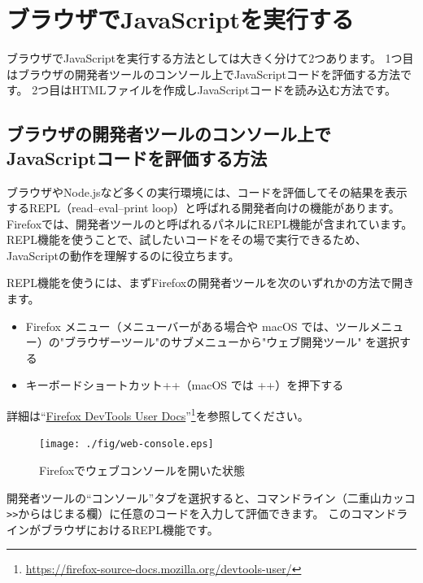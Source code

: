 \hypertarget{execute-js-on-browser}{%
\section{ブラウザでJavaScriptを実行する}\label{execute-js-on-browser}}

ブラウザでJavaScriptを実行する方法としては大きく分けて2つあります。
1つ目はブラウザの開発者ツールのコンソール上でJavaScriptコードを評価する方法です。
2つ目はHTMLファイルを作成しJavaScriptコードを読み込む方法です。

\hypertarget{repl-on-browser}{%
\subsection{ブラウザの開発者ツールのコンソール上でJavaScriptコードを評価する方法}\label{repl-on-browser}}

ブラウザやNode.jsなど多くの実行環境には、コードを評価してその結果を表示するREPL（read--eval--print
loop）と呼ばれる開発者向けの機能があります。
Firefoxでは、開発者ツールの\textbf{}と呼ばれるパネルにREPL機能が含まれています。
REPL機能を使うことで、試したいコードをその場で実行できるため、JavaScriptの動作を理解するのに役立ちます。

REPL機能を使うには、まずFirefoxの開発者ツールを次のいずれかの方法で開きます。

\begin{itemize}
\item
  Firefox メニュー（メニューバーがある場合や macOS
  では、ツールメニュー）の"ブラウザーツール"のサブメニューから"ウェブ開発ツール"
  を選択する
\item
  キーボードショートカット++（macOS では
  ++）を押下する
\end{itemize}

詳細は``\href{https://firefox-source-docs.mozilla.org/devtools-user/}{Firefox DevTools User Docs}''\footnote{\url{https://firefox-source-docs.mozilla.org/devtools-user/}}を参照してください。

\begin{figure}[h]
\centering
\texttt{[image: ./fig/web-console.eps]}
\caption{Firefoxでウェブコンソールを開いた状態}
\end{figure}

開発者ツールの``コンソール''タブを選択すると、コマンドライン（二重山カッコ\lstinline{>>}からはじまる欄）に任意のコードを入力して評価できます。
このコマンドラインがブラウザにおけるREPL機能です。


